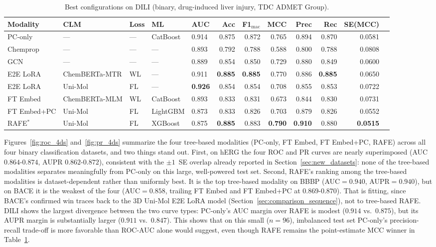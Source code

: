 \documentclass[final,1p,times]{elsarticle}
\begin{document}
\begin{table}[!ht]
\centering
\caption{Best configurations on DILI (binary, drug-induced liver injury, TDC ADMET Group).}
\label{tab:dili}
\begin{adjustbox}{max width=\textwidth}
\begin{tabular}{lllllrrrrrrr}
\toprule
Modality & CLM & Loss & ML & AUC & Acc & F1$_\text{mac}$ & MCC & Prec & Rec & SE(MCC) \\
\midrule
PC-only     & --- & --- & CatBoost & 0.914 & 0.875 & 0.872 & 0.765 & 0.894 & 0.870 & 0.0581 \\
Chemprop    & --- & --- & ---      & 0.893 & 0.792 & 0.788 & 0.588 & 0.800 & 0.788 & 0.0808 \\
GCN         & --- & --- & ---      & 0.889 & 0.854 & 0.850 & 0.729 & 0.880 & 0.849 & 0.0600 \\
\midrule
E2E LoRA    & ChemBERTa-MTR & WL & --- & 0.911 & \textbf{0.885} & \textbf{0.885} & 0.770 & 0.886 & \textbf{0.885} & 0.0650 \\
E2E LoRA    & Uni-Mol       & FL & --- & \textbf{0.926} & 0.854 & 0.854 & 0.708 & 0.855 & 0.853 & 0.0722 \\
\midrule
FT Embed    & ChemBERTa-MLM & WL & CatBoost & 0.893 & 0.833 & 0.831 & 0.673 & 0.844 & 0.830 & 0.0731 \\
FT Embed+PC & Uni-Mol       & FL & LightGBM & 0.873 & 0.833 & 0.826 & 0.703 & 0.879 & 0.826 & 0.0552 \\
RAFE$^*$    & Uni-Mol       & FL & XGBoost  & 0.875 & \textbf{0.885} & 0.883 & \textbf{0.790} & \textbf{0.910} & 0.880 & \textbf{0.0515} \\
\bottomrule
\end{tabular}
\end{adjustbox}
\end{table}

Figures~\ref{fig:roc_4ds} and~\ref{fig:pr_4ds} summarize the four tree-based modalities (PC-only, FT Embed, FT Embed+PC, RAFE) across all four binary classification datasets, and two things stand out. First, on hERG the four ROC and PR curves are nearly superimposed (AUC $0.864$-$0.874$, AUPR $0.862$-$0.872$), consistent with the $\pm1$~SE overlap already reported in Section~\ref{sec:new_datasets}: none of the tree-based modalities separates meaningfully from PC-only on this large, well-powered test set. Second, RAFE's ranking among the tree-based modalities is dataset-dependent rather than uniformly best. It is the top tree-based modality on BBBP (AUC$=0.940$, AUPR$=0.940$), but on BACE it is the weakest of the four (AUC$=0.858$, trailing FT Embed and FT Embed+PC at $0.869$-$0.870$). That is fitting, since BACE's confirmed win traces back to the 3D Uni-Mol E2E LoRA model (Section~\ref{sec:comparison_sequence}), not to tree-based RAFE. DILI shows the largest divergence between the two curve types: PC-only's AUC margin over RAFE is modest ($0.914$ vs.\ $0.875$), but its AUPR margin is substantially larger ($0.911$ vs.\ $0.847$). This shows that on this small ($n=96$), imbalanced test set PC-only's precision-recall trade-off is more favorable than ROC-AUC alone would suggest, even though RAFE remains the point-estimate MCC winner in Table~\ref{tab:dili}.
\end{document}
